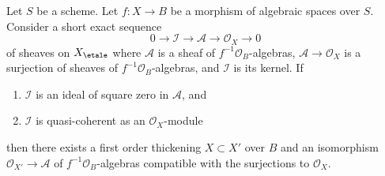 \begin{lemma}
\label{lemma-first-order-thickening}
Let $S$ be a scheme.
Let $f : X \to B$ be a morphism of algebraic spaces over $S$.
Consider a short exact sequence
$$
0 \to \mathcal{I} \to \mathcal{A} \to \mathcal{O}_X \to 0
$$
of sheaves on $X_\etale$ where $\mathcal{A}$ is a sheaf of
$f^{-1}\mathcal{O}_B$-algebras, $\mathcal{A} \to \mathcal{O}_X$ is a surjection
of sheaves of $f^{-1}\mathcal{O}_B$-algebras, and $\mathcal{I}$ is its kernel.
If
\begin{enumerate}
\item $\mathcal{I}$ is an ideal of square zero in $\mathcal{A}$, and
\item $\mathcal{I}$ is quasi-coherent as an $\mathcal{O}_X$-module
\end{enumerate}
then there exists a first order thickening
$X \subset X'$ over $B$ and an isomorphism
$\mathcal{O}_{X'} \to \mathcal{A}$ of $f^{-1}\mathcal{O}_B$-algebras
compatible with the surjections to $\mathcal{O}_X$.
\end{lemma}


